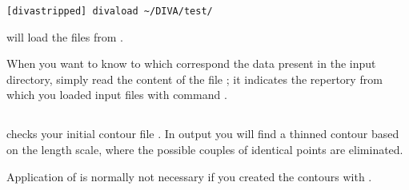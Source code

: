 \example
\begin{lstlisting}[style=Bash]
[divastripped] divaload ~/DIVA/test/
\end{lstlisting}
will load the files from .
 

\btips
When you want to know to which correspond the data present in the input directory, simply read the content of the file ; it indicates the repertory from which you loaded input files with command .
\etips


\subsection{}

 checks your initial contour file . In output  you will find a thinned contour based on the length scale, where the possible couples of identical points are eliminated.

Application of  is normally not necessary if you created the contours with .
